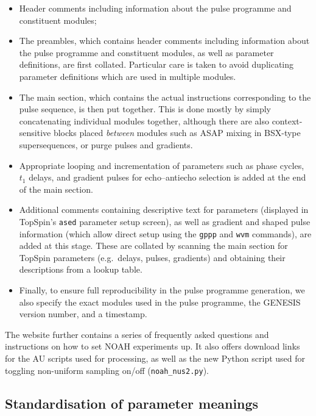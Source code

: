 \documentclass[a4paper,11pt]{article}
\begin{document}
\begin{itemize}
    \item Header comments including information about the pulse programme and constituent modules;
    \item The preambles, which contains header comments including information about the pulse programme and constituent modules, as well as parameter definitions, are first collated.
        Particular care is taken to avoid duplicating parameter definitions which are used in multiple modules.
    \item The main section, which contains the actual instructions corresponding to the pulse sequence, is then put together.
        This is done mostly by simply concatenating individual modules together, although there are also context-sensitive blocks placed \textit{between} modules such as ASAP mixing\autocite{Claridge2019MRC} in BSX-type supersequences, or purge pulses and gradients.
    \item Appropriate looping and incrementation of parameters such as phase cycles, $t_1$ delays, and gradient pulses for echo--antiecho selection is added at the end of the main section.
    \item Additional comments containing descriptive text for parameters (displayed in TopSpin's \texttt{ased} parameter setup screen), as well as gradient and shaped pulse information (which allow direct setup using the \texttt{gppp} and \texttt{wvm} commands), are added at this stage.
        These are collated by scanning the main section for TopSpin parameters (e.g.\ delays, pulses, gradients) and obtaining their descriptions from a lookup table.
    \item Finally, to ensure full reproducibility in the pulse programme generation, we also specify the exact modules used in the pulse programme, the GENESIS version number, and a timestamp.
\end{itemize}

The website further contains a series of frequently asked questions and instructions on how to set NOAH experiments up.
It also offers download links for the AU scripts used for processing, as well as the new Python script used for toggling non-uniform sampling on/off (\texttt{noah\_nus2.py}).

\subsection{Standardisation of parameter meanings}
\end{document}
